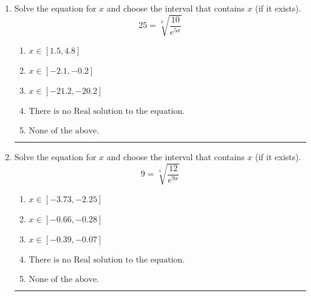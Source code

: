 \documentclass[14pt]{extbook}
\newcommand{\litem}[1]{\item#1\hspace*{-1cm}\rule{\textwidth}{0.4pt}}
\begin{document}
\begin{enumerate}
{\begin{enumerate}[label=\Alph*.]
\end{enumerate} }
\litem{
 Solve the equation for $x$ and choose the interval that contains $x$ (if it exists).\[  25 = \sqrt[4]{\frac{10}{e^{5x}}} \]\begin{enumerate}[label=\Alph*.]
\item \( x \in [1.5, 4.8] \)
\item \( x \in [-2.1, -0.2] \)
\item \( x \in [-21.2, -20.2] \)
\item \( \text{There is no Real solution to the equation.} \)
\item \( \text{None of the above.} \)

\end{enumerate} }
\litem{
 Solve the equation for $x$ and choose the interval that contains $x$ (if it exists).\[  9 = \sqrt[3]{\frac{12}{e^{9x}}} \]\begin{enumerate}[label=\Alph*.]
\item \( x \in [-3.73, -2.25] \)
\item \( x \in [-0.66, -0.28] \)
\item \( x \in [-0.39, -0.07] \)
\item \( \text{There is no Real solution to the equation.} \)
\item \( \text{None of the above.} \)

\end{enumerate} }
\end{enumerate}
\end{document}
